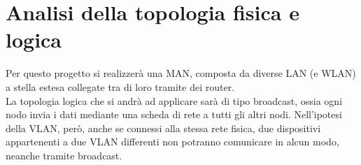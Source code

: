 \section{Analisi della topologia fisica e logica}
\hspace{24pt}Per questo progetto si realizzerà una MAN, composta da diverse LAN (e WLAN) a stella estesa collegate tra 
di loro tramite dei router. \\
\hspace{24pt}La topologia logica che si andrà ad applicare sarà di tipo broadcast, ossia ogni nodo invia i dati 
mediante una scheda di rete a tutti gli altri nodi. Nell'ipotesi della VLAN, però, anche se connessi alla stessa rete 
fisica, due dispositivi appartenenti a due VLAN differenti non potranno comunicare in alcun modo, neanche tramite 
broadcast.